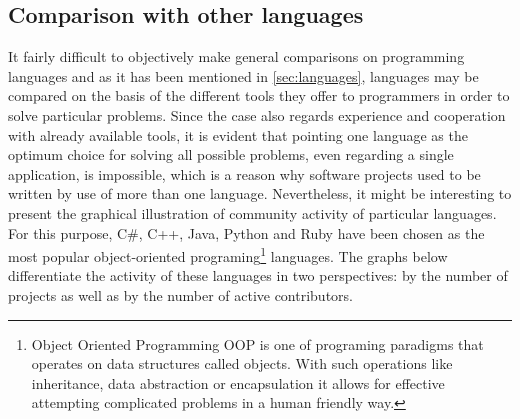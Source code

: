 \subsection{Comparison with other languages}\label{subsec:lang_compare}
It fairly difficult to objectively make general comparisons on programming languages and as it has been mentioned in \ref{sec:languages}, languages may be compared on the basis of the different tools they offer to programmers in order to solve particular problems. Since the case also regards experience and cooperation with already available tools, it is evident that pointing one language as the optimum choice for solving all possible problems, even regarding a single application, is impossible, which is a reason why software projects used to be written by use of more than one language. Nevertheless, it might be interesting to present the graphical illustration of community activity of particular languages. For this purpose, C\#, C++, Java, Python and Ruby have been chosen as the most popular object-oriented programing\footnote{Object Oriented Programming OOP is one of programing paradigms that operates on data structures called objects. With such operations like inheritance, data abstraction or encapsulation it allows for effective attempting complicated problems in a human friendly way.} languages. The graphs below differentiate the activity of these languages in two perspectives: by the number of projects as well as by the number of active contributors.

